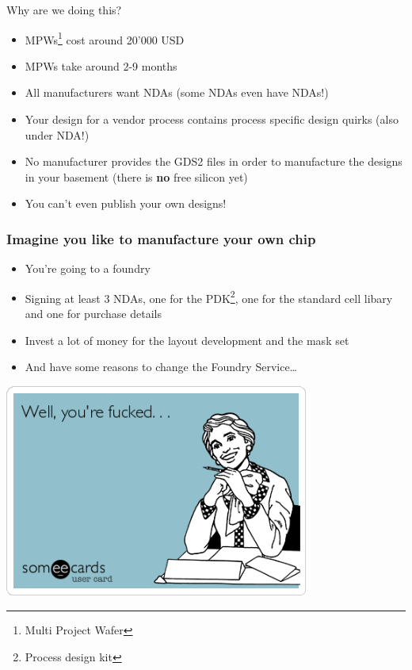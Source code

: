 \documentclass{beamer}
\begin{document}
\begin{frame}{Why are we doing this?}
	\begin{itemize}
		\item MPWs\footnote{Multi Project Wafer} cost around 20'000 USD
		\item MPWs take around 2-9 months
		\item All manufacturers want NDAs (some NDAs even have NDAs!)
		\item Your design for a vendor process contains process specific design quirks (also under NDA!)
		\item No manufacturer provides the GDS2 files in order to manufacture the designs in your basement (there is \textbf{no} free silicon yet)
		\item You can't even publish your own designs!
	\end{itemize}
\end{frame}

\begin{frame}
	\frametitle{Imagine you like to manufacture your own chip}
	\begin{itemize}
		\item You're going to a foundry
		\item Signing at least 3 NDAs, one for the PDK\footnote{Process design kit}, one for the standard cell libary and one for purchase details
		\item Invest a lot of money for the layout development and the mask set
		\item And have some reasons to change the Foundry Service\dots
	\end{itemize}
\end{frame}

\begin{frame}
	\centering
	\includegraphics[width=0.75\textwidth]{youre-fucked.png}
\end{frame}
\end{document}
